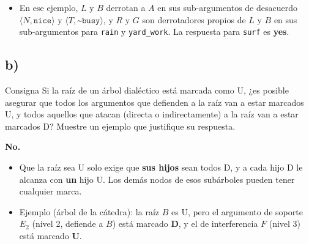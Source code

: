 \documentclass[11pt,a4paper]{article}
\newcommand{\nf}{\textasciitilde}                 %
\begin{document}
\begin{center}
\begin{minipage}{\linewidth}
\centering
{}
\end{minipage}
\end{center}

\begin{extras}
\begin{itemize}
  \item En ese ejemplo, $L$ y $B$ derrotan a $A$ en sus sub-argumentos de desacuerdo $\langle N, \texttt{nice}\rangle$ y $\langle T, \texttt{\nf busy}\rangle$, y $R$ y $G$ son derrotadores propios de $L$ y $B$ en sus sub-argumentos para \texttt{rain} y \texttt{yard\_work}. La respuesta para \texttt{surf} es \textbf{yes}.
\end{itemize}
\end{extras}

\subsection{b)}

\begin{enunciado}{Consigna}
Si la raíz de un árbol dialéctico está marcada como U, ¿es posible asegurar que todos los argumentos que defienden a la raíz van a estar marcados U, y todos aquellos que atacan (directa o indirectamente) a la raíz van a estar marcados D? Muestre un ejemplo que justifique su respuesta.
\end{enunciado}

\textbf{No.}
\begin{itemize}
  \item Que la raíz sea U solo exige que \textbf{sus hijos} sean todos D, y a cada hijo D le alcanza con \textbf{un} hijo U. Los demás nodos de esos subárboles pueden tener cualquier marca.
  \item Ejemplo (árbol de la cátedra): la raíz $B$ es U, pero el argumento de soporte $E_2$ (nivel 2, defiende a $B$) está marcado \textbf{D}, y el de interferencia $F$ (nivel 3) está marcado \textbf{U}.
\end{itemize}
\end{document}
